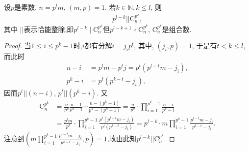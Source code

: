 \documentclass[../../main.tex]{subfiles}%
\begin{document}
\begin{lemma}\label{lemma:Sylow定理证明引理1}
设$p$是素数, $n=p^lm$, $(m,p)=1$. 若$k\in\mathbb{N}, k\leqslant l$, 则
\begin{align*}
p^{l-k}||\mathrm{C}_n^{p^k}, 
\end{align*}
其中 $||$表示恰能整除,即$p^{l-k}\mid \mathrm{C}_n^{p^k}$但$p^{l-k+1}\nmid \mathrm{C}_n^{p^k}$, $\mathrm{C}_n^{p^k}$是组合数.
\end{lemma}
\begin{proof}

当$1\leqslant i\leqslant p^k-1$时,$i$都有分解$i=j_ip^t$, 其中, $(j_i,p)=1$, 于是有$t<k\leqslant l$, 而此时
\begin{align*}
n-i&=p^lm-p^tj=p^t(p^{l-t}m-j_i), \\
p^k-i&=p^t(p^{k-t}-j_i),
\end{align*}
因而$p^t||(n-i)$, $p^t||(p^k-i)$. 又
\begin{align*}
\mathrm{C}_{n}^{p^k}&=\frac{n}{p^k}\frac{n-1}{p^k-1}\cdots \frac{n-(p^k-1)}{p^k-(p^k-1)}=\frac{n}{p^k}\cdot \prod_{i=1}^{p^k-1}{\frac{n-i}{p^k-i}}
\\
&=\frac{p^lm}{p^k}\cdot \prod_{i=1}^{p^k-1}{\frac{p^t\left( p^{l-t}m-j_i \right)}{p^t\left( p^{k-t}-j_i \right)}}=p^{l-k}\cdot m\prod_{i=1}^{p^k-1}{\frac{p^{l-t}m-j_i}{p^{k-t}-j_i}}.
\end{align*}
注意到$(m\prod_{i=1}^{p^k-1}{\frac{p^{l-t}m-j_i}{p^{k-t}-j_i}},p)=1$,故由此知$p^{l-k}||\mathrm{C}_n^{p^k}$.

\end{proof}
\end{document}
